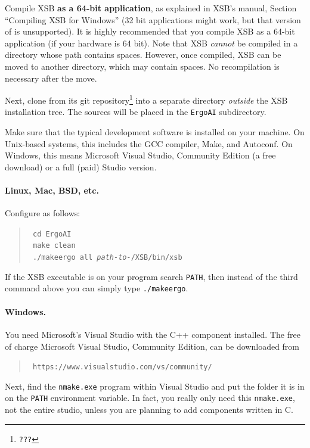 \documentclass[11pt]{article}
\newcommand{\ERGO}{\mbox{\smaller{\ensuremath{\cal{E}}\smaller{{\sc{RGO}}}}}\xspace}
\newcommand{\FLSYSTEM}{\ERGO}
\begin{document}
{Compile XSB \textbf{as a 64-bit application}, as explained in XSB's manual,
Section ``Compiling XSB for Windows''
(32 bit applications might work, but that version of \ERGO is unsupported).
It is highly recommended that you compile XSB as a 64-bit application (if
your hardware is 64 bit).
Note that XSB \emph{cannot} be compiled in a directory whose path contains
spaces.  However, once compiled, XSB can be moved to another directory,
which may contain spaces. No recompilation is necessary after the move.

\sloppy
Next, clone \FLSYSTEM from its git repository\footnote{
\texttt{???}
}
into a
separate directory \emph{outside} the XSB installation tree.  The \FLSYSTEM
sources will be placed in the {\tt ErgoAI} subdirectory.

Make sure that the typical development software is installed on your
machine. On Unix-based systems, this includes the GCC compiler, Make, and
Autoconf. On Windows, this means Microsoft Visual Studio, Community Edition
(a free download) or a full (paid) Studio version.

\paragraph{Linux, Mac, BSD, etc.}
Configure \FLSYSTEM as follows:
\begin{quote}
  \tt
   cd ErgoAI\\
   \tt
   make clean\\
   \tt
   ./makeergo all \textnormal{\emph{path-to-}}/XSB/bin/xsb
\end{quote}
If the XSB executable is on your program search {\tt PATH}, then instead of the
third command above you can simply type
\texttt{./makeergo}. 

\paragraph{Windows.}
You need Microsoft's Visual Studio with the C++ component installed.
The free of charge Microsoft Visual Studio, Community Edition, can be
downloaded from
\begin{quote}
\tt
 https://www.visualstudio.com/vs/community/
\end{quote}
Next, find the \texttt{nmake.exe} program within Visual Studio and put the
folder it is in on the \texttt{PATH} environment variable.  
In fact, you really only need this \texttt{nmake.exe}, not the entire
studio, unless you are planning to add components written in C.

}
\end{document}
